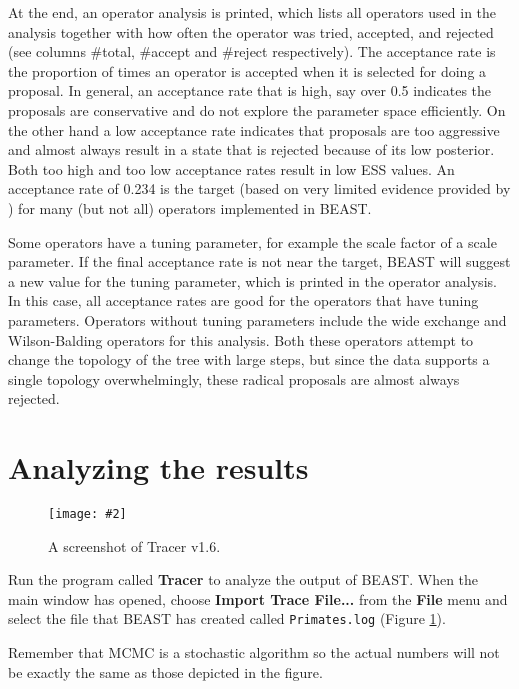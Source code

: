\documentclass[12pt]{article}
\newcommand{\TracerVersion}{1.6}
\newcommand{\includeimage}[2][]{%
\texttt{[image: \#2]}
}
\begin{document}
At the end, an operator analysis is printed, which lists all operators used in the
analysis together with how often the operator was tried, accepted, and rejected
(see columns \#total, \#accept and \#reject respectively). The acceptance rate is
the proportion of times an operator is accepted when it is selected for doing a
proposal. In general, an acceptance rate that is high, say over 0.5 indicates the
proposals are conservative and do not explore the parameter space efficiently. On
the other hand a low acceptance rate indicates that proposals are too aggressive
and almost always result in a state that is rejected because of its low posterior.
Both too high and too low acceptance rates result in low ESS values. 
An acceptance rate of 0.234 is the target (based on very limited evidence provided by \cite{gelman1996efficient}) for many (but not all) operators implemented in BEAST.

Some operators have a tuning parameter, for example the scale factor of a
scale parameter. If the final acceptance rate is not near the target, BEAST will
suggest a new value for the tuning parameter, which is printed in the operator analysis. In this case, all acceptance rates are good for the operators that have tuning parameters. Operators without tuning parameters include the wide
exchange and Wilson-Balding operators for this analysis. Both these operators
attempt to change the topology of the tree with large steps, but since the data
supports a single topology overwhelmingly, these radical proposals are almost
always rejected.

\section{Analyzing the results}

\begin{figure}
\centering	
\includeimage[width=0.9\textwidth]{figures/Tracer1}
\caption{A screenshot of Tracer v{\TracerVersion}.}
\label{fig:Tracer1}
\end{figure}

Run the program called {\bf Tracer} to analyze the output of BEAST. When the main
window has opened, choose {\bf Import Trace File...} from the {\bf File} menu and select the file that
BEAST has created called \texttt{Primates.log} (Figure \ref{fig:Tracer1}).

Remember that MCMC is a stochastic algorithm so the actual numbers will not be exactly the same as those depicted in the figure.
\end{document}
